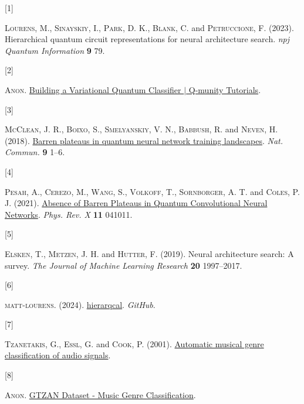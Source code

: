 \documentclass[
  13pt,
  a4paper,
  DIV=11,
  numbers=noendperiod]{scrreprt}
\newlength{\cslhangindent}
\newlength{\csllabelwidth}
\newenvironment{CSLReferences}[2] %
 {\begin{list}{}{%
  \setlength{\itemindent}{0pt}
  \setlength{\leftmargin}{0pt}
  \setlength{\parsep}{0pt}
  \ifodd #1
   \setlength{\leftmargin}{\cslhangindent}
   \setlength{\itemindent}{-1\cslhangindent}
  \fi
  \setlength{\itemsep}{#2\baselineskip}}}
 {\end{list}}
\newcommand{\CSLLeftMargin}[1]{\parbox[t]{\csllabelwidth}{\strut#1\strut}}
\newcommand{\CSLRightInline}[1]{\parbox[t]{\linewidth - \csllabelwidth}{\strut#1\strut}}
\begin{document}
\label{refs}
\begin{CSLReferences}{0}{1}
\CSLLeftMargin{{[}1{]} }%
\CSLRightInline{\textsc{Lourens}, M., \textsc{Sinayskiy}, I.,
\textsc{Park}, D. K., \textsc{Blank}, C. and \textsc{Petruccione}, F.
(2023). Hierarchical quantum circuit representations for neural
architecture search. \emph{npj Quantum Information} \textbf{9} 79.}

\CSLLeftMargin{{[}2{]} }%
\CSLRightInline{\textsc{Anon}.
\href{https://www.qmunity.tech/tutorials/building-a-variational-quantum-classifier}{{Building
a Variational Quantum Classifier {\(\vert\)} Q-munity Tutorials}}.}

\CSLLeftMargin{{[}3{]} }%
\CSLRightInline{\textsc{McClean}, J. R., \textsc{Boixo}, S.,
\textsc{Smelyanskiy}, V. N., \textsc{Babbush}, R. and \textsc{Neven}, H.
(2018). \href{https://doi.org/10.1038/s41467-018-07090-4}{{Barren
plateaus in quantum neural network training landscapes}}. \emph{Nat.
Commun.} \textbf{9} 1--6.}

\CSLLeftMargin{{[}4{]} }%
\CSLRightInline{\textsc{Pesah}, A., \textsc{Cerezo}, M., \textsc{Wang},
S., \textsc{Volkoff}, T., \textsc{Sornborger}, A. T. and \textsc{Coles},
P. J. (2021). \href{https://doi.org/10.1103/PhysRevX.11.041011}{{Absence
of Barren Plateaus in Quantum Convolutional Neural Networks}}.
\emph{Phys. Rev. X} \textbf{11} 041011.}

\CSLLeftMargin{{[}5{]} }%
\CSLRightInline{\textsc{Elsken}, T., \textsc{Metzen}, J. H. and
\textsc{Hutter}, F. (2019). Neural architecture search: A survey.
\emph{The Journal of Machine Learning Research} \textbf{20} 1997--2017.}

\CSLLeftMargin{{[}6{]} }%
\CSLRightInline{\textsc{matt-lourens}. (2024).
\href{https://github.com/matt-lourens/hierarqcal?tab=readme-ov-file}{{hierarqcal}}.
\emph{GitHub}.}

\CSLLeftMargin{{[}7{]} }%
\CSLRightInline{\textsc{Tzanetakis}, G., \textsc{Essl}, G. and
\textsc{Cook}, P. (2001).
\href{http://ismir2001.ismir.net/pdf/tzanetakis.pdf}{Automatic musical
genre classification of audio signals}.}

\CSLLeftMargin{{[}8{]} }%
\CSLRightInline{\textsc{Anon}.
\href{https://www.kaggle.com/datasets/andradaolteanu/gtzan-dataset-music-genre-classification?resource=download}{{GTZAN
Dataset - Music Genre Classification}}.}


\end{CSLReferences}
\end{document}

